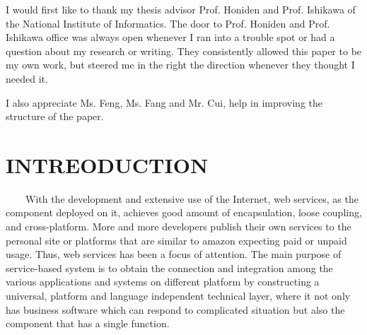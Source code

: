 \documentclass[senior,final,11pt]{iscs-thesis}
\begin{document}
\begin{acknowledge}
I would first like to thank my thesis advisor Prof. Honiden and Prof. Ishikawa of the National Institute of Informatics. The door to Prof. Honiden and Prof. Ishikawa office was always open whenever I ran into a trouble spot or had a question about my research or writing. They consistently allowed this paper to be my own work, but steered me in the right the direction whenever they thought I needed it.

I also appreciate Ms. Feng, Ms. Fang and Mr. Cui, help in improving the structure of the paper.
\end{acknowledge}

\frontmatter 
\tableofcontents
\mainmatter 

\chapter{INTREODUCTION}
~~~~With the development and extensive use of the Internet, web services, as the component deployed on it, achieves good amount of encapsulation, loose coupling, and cross-platform. More and more developers publish their own services to the personal site or platforms that are similar to amazon expecting paid or unpaid usage. Thus, web services has been a focus of attention\cite{papazoglou2008service}.
The main purpose of service-based system is to obtain the connection and integration among the various applications and systems on different platform by constructing a universal, platform and language independent technical layer, where it not only has business software which can respond to complicated situation but also the component that has a single function.
\end{document}
